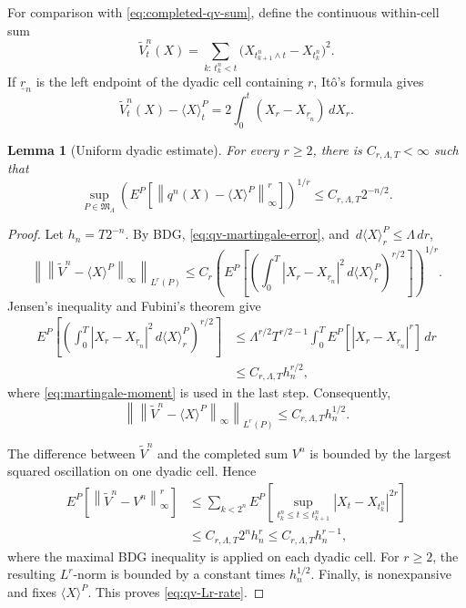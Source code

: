 \documentclass[11pt,reqno]{amsart}
\theoremstyle{plain}
\newtheorem{lemma}[lemma]{Lemma}
\theoremstyle{definition}
\newcommand{\dd}{\,d}
\newcommand{\norm}[1]{\left\lVert #1\right\rVert}
\newcommand{\abs}[1]{\left\lvert #1\right\rvert}
\begin{document}
For comparison with \eqref{eq:completed-qv-sum}, define the continuous
within-cell sum
\[
  \widetilde V_t^n(X)
  =
  \sum_{k:\,t_k^n<t}
  \bigl(
    X_{t_{k+1}^n\wedge t}-X_{t_k^n}
  \bigr)^2.
\]
If \(\underline r_n\) is the left endpoint of the dyadic cell containing
\(r\), It\^o's formula gives
\begin{equation}\label{eq:qv-martingale-error}
  \widetilde V_t^n(X)-\langle X\rangle_t^P
  =
  2\int_0^t(X_r-X_{\underline r_n})\dd X_r.
\end{equation}

\begin{lemma}[Uniform dyadic estimate]\label{lem:dyadic-estimate}
For every \(r\ge2\), there is \(C_{r,\Lambda,T}<\infty\) such that
\begin{equation}\label{eq:qv-Lr-rate}
  \sup_{P\in\mathfrak M_\Lambda}
  \left(
    E^P\left[
      \norm{q^n(X)-\langle X\rangle^P}_\infty^r
    \right]
  \right)^{1/r}
  \le C_{r,\Lambda,T}2^{-n/2}.
\end{equation}
\end{lemma}

\begin{proof}
Let \(h_n=T2^{-n}\).  By BDG, \eqref{eq:qv-martingale-error}, and
\(\dd\langle X\rangle_r^P\le\Lambda\dd r\),
\[
  \left\|
    \norm{\widetilde V^n-\langle X\rangle^P}_\infty
  \right\|_{L^r(P)}
  \le
  C_r
  \left(
    E^P\left[
      \left(
        \int_0^T
        \abs{X_r-X_{\underline r_n}}^2
        \dd\langle X\rangle_r^P
      \right)^{r/2}
    \right]
  \right)^{1/r}.
\]
Jensen's inequality and Fubini's theorem give
\begin{align*}
E^P\left[
  \left(\int_0^T
    \abs{X_r-X_{\underline r_n}}^2\dd\langle X\rangle_r^P
  \right)^{r/2}
\right]
&\le
\Lambda^{r/2}T^{r/2-1}
\int_0^T E^P\!\left[
  \abs{X_r-X_{\underline r_n}}^r
\right]\dd r\\
&\le C_{r,\Lambda,T}h_n^{r/2},
\end{align*}
where \eqref{eq:martingale-moment} is used in the last step.
Consequently,
\[
  \left\|
    \norm{\widetilde V^n-\langle X\rangle^P}_\infty
  \right\|_{L^r(P)}
  \le C_{r,\Lambda,T}h_n^{1/2}.
\]

The difference between \(\widetilde V^n\) and the completed sum \(V^n\) is
bounded by the largest squared oscillation on one dyadic cell.  Hence
\begin{align*}
  E^P\left[
    \norm{\widetilde V^n-V^n}_\infty^r
  \right]
  &\le
  \sum_{k<2^n}
  E^P\left[
    \sup_{t_k^n\le t\le t_{k+1}^n}
    \abs{X_t-X_{t_k^n}}^{2r}
  \right]\\
  &\le C_{r,\Lambda,T}2^nh_n^r
   \le C_{r,\Lambda,T}h_n^{r-1},
\end{align*}
where the maximal BDG inequality is applied on each dyadic cell.  For
\(r\ge2\), the resulting \(L^r\)-norm is bounded by a constant times
\(h_n^{1/2}\).  Finally,  is nonexpansive and
fixes \(\langle X\rangle^P\).
This proves \eqref{eq:qv-Lr-rate}.
\end{proof}
\end{document}

